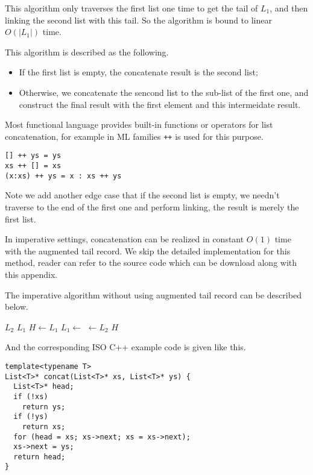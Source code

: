 \documentclass{article}
\begin{document}
This algorithm only traverses the first list one time to get the tail of $L_1$, and then linking the second list
with this tail. So the algorithm is bound to linear $O(|L_1|)$ time.

This algorithm is described as the following.

\begin{itemize}
\item If the first list is empty, the concatenate result is the second list;
\item Otherwise, we concatenate the sencond list to the sub-list of the first one, and construct the final result
with the first element and this intermeidate result.
\end{itemize}

Most functional language provides built-in functions or operators for list concatenation, for example in ML families
\verb|++| is used for this purpose.

\lstset{language=Haskell}
\begin{lstlisting}
[] ++ ys = ys
xs ++ [] = xs
(x:xs) ++ ys = x : xs ++ ys
\end{lstlisting}

Note we add another edge case that if the second list is empty, we needn't traverse to the end of the first one
and perform linking, the result is merely the first list.

In imperative settings, concatenation can be realized in constant $O(1)$ time with the augmented tail record.
We skip the detailed implementation for this method, reader can refer to the source code which can be download
along with this appendix.

The imperative algorithm without using augmented tail record can be described below.

\begin{algorithmic}
    \State \Return $L_2$
  \EndIf
    \State \Return $L_1$
  \EndIf
  \State $H \gets L_1$
    \State $L_1 \gets$ 
  \EndWhile
  \State {} $\gets L_2$
  \State \Return $H$
\EndFunction
\end{algorithmic}

And the corresponding ISO C++ example code is given like this.

\lstset{language=C++}
\begin{lstlisting}
template<typename T>
List<T>* concat(List<T>* xs, List<T>* ys) {
  List<T>* head;
  if (!xs)
    return ys;
  if (!ys)
    return xs;
  for (head = xs; xs->next; xs = xs->next);
  xs->next = ys;
  return head;
}
\end{lstlisting}
\end{document}
